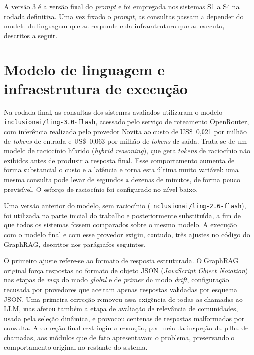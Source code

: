 A versão 3 é a versão final do \textit{prompt} e foi empregada nos sistemas S1 a S4 na rodada definitiva. Uma vez fixado o \textit{prompt}, as consultas passam a depender do modelo de linguagem que as responde e da infraestrutura que as executa, descritos a seguir.

\section{Modelo de linguagem e infraestrutura de execução}\label{sec:met-modelo}

Na rodada final, as consultas dos sistemas avaliados utilizaram o modelo \texttt{inclusionai/ling-3.0-flash}, acessado pelo serviço de roteamento OpenRouter, com inferência realizada pelo provedor Novita ao custo de US\$~0,021 por milhão de \textit{tokens} de entrada e US\$~0,063 por milhão de \textit{tokens} de saída. Trata-se de um modelo de raciocínio híbrido (\textit{hybrid reasoning}), que gera \textit{tokens} de raciocínio não exibidos antes de produzir a resposta final. Esse comportamento aumenta de forma substancial o custo e a latência e torna esta última muito variável: uma mesma consulta pode levar de segundos a dezenas de minutos, de forma pouco previsível. O esforço de raciocínio foi configurado no nível baixo.

Uma versão anterior do modelo, sem raciocínio (\texttt{inclusionai/ling-2.6-flash}), foi utilizada na parte inicial do trabalho e posteriormente substituída, a fim de que todos os sistemas fossem comparados sobre o mesmo modelo. A execução com o modelo final e com esse provedor exigiu, contudo, três ajustes no código do GraphRAG, descritos nos parágrafos seguintes.

O primeiro ajuste refere-se ao formato de resposta estruturada. O GraphRAG original força respostas no formato de objeto JSON (\textit{JavaScript Object Notation}) nas etapas de \textit{map} do modo \textit{global} e de \textit{primer} do modo \textit{drift}, configuração recusada por provedores que aceitam apenas respostas validadas por esquema JSON. Uma primeira correção removeu essa exigência de todas as chamadas ao LLM, mas afetou também a etapa de avaliação de relevância de comunidades, usada pela seleção dinâmica, e provocou centenas de respostas malformadas por consulta. A correção final restringiu a remoção, por meio da inspeção da pilha de chamadas, aos módulos que de fato apresentavam o problema, preservando o comportamento original no restante do sistema.

